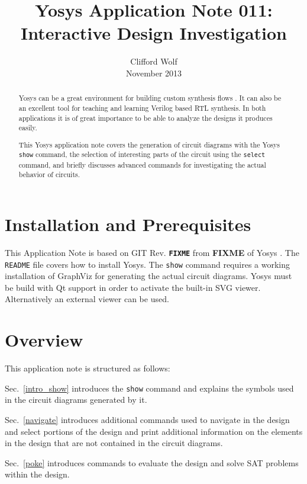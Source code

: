 \documentclass[9pt,technote,a4paper]{IEEEtran}
\def\FIXME{{\color{red}\bf FIXME}}
\begin{document}
\title{Yosys Application Note 011: \\ Interactive Design Investigation}
\author{Clifford Wolf \\ November 2013}
\maketitle

\begin{abstract}
Yosys \cite{yosys} can be a great environment for building custom synthesis
flows \cite{glaserwolf}. It can also be an excellent tool for teaching and
learning Verilog based RTL synthesis. In both applications it is of great
importance to be able to analyze the designs it produces easily.

This Yosys application note covers the generation of circuit diagrams with the
Yosys {\tt show} command, the selection of interesting parts of the circuit
using the {\tt select} command, and briefly discusses advanced commands for
investigating the actual behavior of circuits.
\end{abstract}

\section{Installation and Prerequisites}

This Application Note is based on GIT Rev. {\tt \FIXME} from \FIXME{} of
Yosys \cite{yosys}. The {\tt README} file covers how to install Yosys. The
{\tt show} command requires a working installation of GraphViz \cite{graphviz}
for generating the actual circuit diagrams. Yosys must be build with Qt
support in order to activate the built-in SVG viewer. Alternatively an
external viewer can be used.

\section{Overview}

This application note is structured as follows:

Sec.~\ref{intro_show} introduces the {\tt show} command and explains the
symbols used in the circuit diagrams generated by it.

Sec.~\ref{navigate} introduces additional commands used to navigate in the
design and select portions of the design and print additional information on
the elements in the design that are not contained in the circuit diagrams.

Sec.~\ref{poke} introduces commands to evaluate the design and solve SAT
problems within the design.
\end{document}
